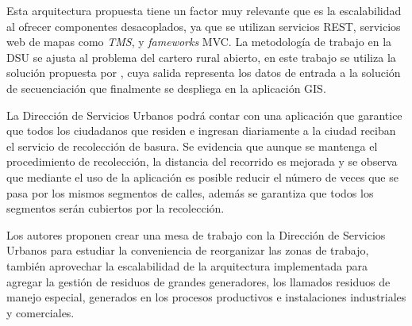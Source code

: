 \documentclass[spanish, conference]{IEEEtran}
\begin{document}
Esta arquitectura propuesta tiene un factor muy relevante que es la escalabilidad al ofrecer componentes desacoplados, ya que se utilizan servicios REST, servicios web de mapas como \textit{TMS}, y \textit{fameworks} MVC. La metodología de trabajo en la DSU se ajusta al problema del cartero rural abierto, en este trabajo se utiliza la solución propuesta por \cite{Braier2017AnArgentina}, cuya salida representa los datos de entrada a la solución de secuenciación que finalmente se despliega en la aplicación GIS.

La Dirección de Servicios Urbanos podrá contar con una aplicación que garantice que todos los ciudadanos que residen e ingresan diariamente a la ciudad reciban el servicio de recolección de basura. Se evidencia que aunque se mantenga el procedimiento de recolección, la distancia del recorrido es mejorada y se observa que mediante el uso de la aplicación es posible reducir el número de veces que se pasa por los mismos segmentos de calles, además se garantiza que todos los segmentos serán cubiertos por la recolección.

Los autores proponen crear una mesa de trabajo con la Dirección de Servicios Urbanos para estudiar la conveniencia de reorganizar las zonas de trabajo, también aprovechar la escalabilidad de la arquitectura implementada para agregar la gestión de residuos de grandes generadores, los llamados residuos de manejo especial, generados en los procesos productivos e instalaciones industriales y comerciales.


\end{document}

